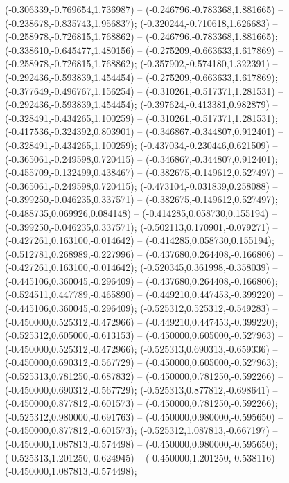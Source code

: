  (-0.306339,-0.769654,1.736987) -- (-0.246796,-0.783368,1.881665) -- (-0.238678,-0.835743,1.956837);
 (-0.320244,-0.710618,1.626683) -- (-0.258978,-0.726815,1.768862) -- (-0.246796,-0.783368,1.881665);
 (-0.338610,-0.645477,1.480156) -- (-0.275209,-0.663633,1.617869) -- (-0.258978,-0.726815,1.768862);
 (-0.357902,-0.574180,1.322391) -- (-0.292436,-0.593839,1.454454) -- (-0.275209,-0.663633,1.617869);
 (-0.377649,-0.496767,1.156254) -- (-0.310261,-0.517371,1.281531) -- (-0.292436,-0.593839,1.454454);
 (-0.397624,-0.413381,0.982879) -- (-0.328491,-0.434265,1.100259) -- (-0.310261,-0.517371,1.281531);
 (-0.417536,-0.324392,0.803901) -- (-0.346867,-0.344807,0.912401) -- (-0.328491,-0.434265,1.100259);
 (-0.437034,-0.230446,0.621509) -- (-0.365061,-0.249598,0.720415) -- (-0.346867,-0.344807,0.912401);
 (-0.455709,-0.132499,0.438467) -- (-0.382675,-0.149612,0.527497) -- (-0.365061,-0.249598,0.720415);
 (-0.473104,-0.031839,0.258088) -- (-0.399250,-0.046235,0.337571) -- (-0.382675,-0.149612,0.527497);
 (-0.488735,0.069926,0.084148) -- (-0.414285,0.058730,0.155194) -- (-0.399250,-0.046235,0.337571);
 (-0.502113,0.170901,-0.079271) -- (-0.427261,0.163100,-0.014642) -- (-0.414285,0.058730,0.155194);
 (-0.512781,0.268989,-0.227996) -- (-0.437680,0.264408,-0.166806) -- (-0.427261,0.163100,-0.014642);
 (-0.520345,0.361998,-0.358039) -- (-0.445106,0.360045,-0.296409) -- (-0.437680,0.264408,-0.166806);
 (-0.524511,0.447789,-0.465890) -- (-0.449210,0.447453,-0.399220) -- (-0.445106,0.360045,-0.296409);
 (-0.525312,0.525312,-0.549283) -- (-0.450000,0.525312,-0.472966) -- (-0.449210,0.447453,-0.399220);
 (-0.525312,0.605000,-0.613153) -- (-0.450000,0.605000,-0.527963) -- (-0.450000,0.525312,-0.472966);
 (-0.525313,0.690313,-0.659336) -- (-0.450000,0.690312,-0.567729) -- (-0.450000,0.605000,-0.527963);
 (-0.525313,0.781250,-0.687832) -- (-0.450000,0.781250,-0.592266) -- (-0.450000,0.690312,-0.567729);
 (-0.525313,0.877812,-0.698641) -- (-0.450000,0.877812,-0.601573) -- (-0.450000,0.781250,-0.592266);
 (-0.525312,0.980000,-0.691763) -- (-0.450000,0.980000,-0.595650) -- (-0.450000,0.877812,-0.601573);
 (-0.525312,1.087813,-0.667197) -- (-0.450000,1.087813,-0.574498) -- (-0.450000,0.980000,-0.595650);
 (-0.525313,1.201250,-0.624945) -- (-0.450000,1.201250,-0.538116) -- (-0.450000,1.087813,-0.574498);
